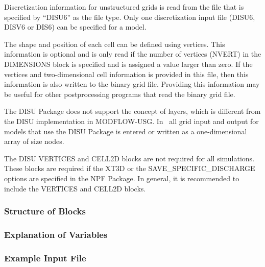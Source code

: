 Discretization information for unstructured grids is read from the file that is specified by ``DISU6'' as the file type.  Only one discretization input file (DISU6, DISV6 or DIS6) can be specified for a model.

The shape and position of each cell can be defined using vertices.  This information is optional and is only read if the number of vertices (NVERT) in the DIMENSIONS block is specified and is assigned a value larger than zero.  If the vertices and two-dimensional cell information is provided in this file, then this information is also written to the binary grid file.  Providing this information may be useful for other postprocessing programs that read the binary grid file.

The DISU Package does not support the concept of layers, which is different from the DISU implementation in MODFLOW-USG.  In \mf~all grid input and output for models that use the DISU Package is entered or written as a one-dimensional array of size nodes.

The DISU VERTICES and CELL2D blocks are not required for all simulations.  These blocks are required if the XT3D or the SAVE\_SPECIFIC\_DISCHARGE options are specified in the NPF Package.  In general, it is recommended to include the VERTICES and CELL2D blocks. 

\vspace{5mm}
\subsubsection{Structure of Blocks}







\vspace{5mm}
\subsubsection{Explanation of Variables}
\begin{description}

\end{description}

\vspace{5mm}
\subsubsection{Example Input File}


